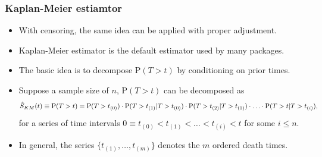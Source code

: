 \documentclass[10pt]{beamer}\usepackage[]{graphicx}\usepackage[]{color}
\newcommand{\p}{\mathrm{P}}
\newcommand{\Skm}{\hat{S}_{\scriptsize{KM}}}
\begin{document}
\begin{frame}[fragile]
  \frametitle{Kaplan-Meier estiamtor}
  \begin{itemize}
  \item With censoring, the same idea can be applied with proper adjustment.
  \item Kaplan-Meier estimator is the default estimator used by many packages. 
  \item The basic idea is to decompose $\p(T > t)$ by conditioning on prior times.
  \item Suppose a sample size of $n$, $\p(T>t)$ can be decomposed as
    {\scriptsize
    \begin{equation*}
      \Skm(t) \equiv  \p(T > t) = 
      \p(T > t_{(0)}) \cdot \p(T > t_{(1)} | T > t_{(0)}) \cdot \p(T > t_{(2)} | T > t_{(1)}) 
      \cdot\ldots\cdot \p(T > t | T > t_{(i)}),
    \end{equation*}}
    for a series of time intervals $0 \equiv t_{(0)} < t_{(1)} < \ldots < t_{(i)} < t$ for some $i\le n$.
  \item In general, the series $\{t_{(1)}, \ldots, t_{(m)}\}$ 
    denotes the $m$ ordered death times.
  \end{itemize}
\end{frame}
\end{document}
